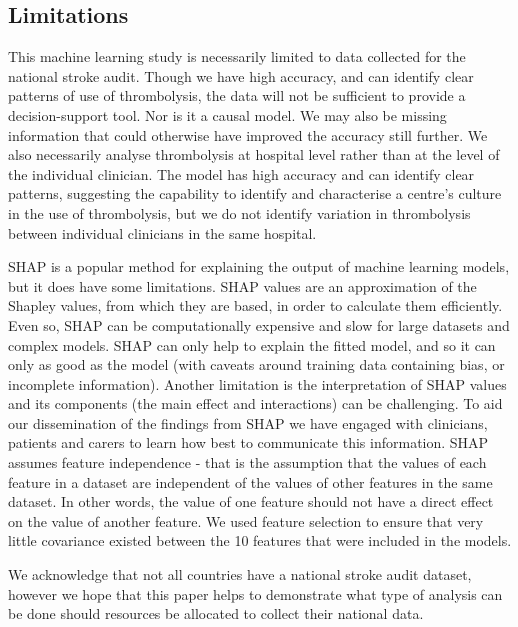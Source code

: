
\subsection{Limitations}

This machine learning study is necessarily limited to data collected for the national stroke audit. Though we have high accuracy, and can identify clear patterns of use of thrombolysis, the data will not be sufficient to provide a decision-support tool. Nor is it a causal model. We may also be missing information that could otherwise have improved the accuracy still further. We also necessarily analyse thrombolysis at hospital level rather than at the level of the individual clinician. The model has high accuracy and can identify clear patterns, suggesting the capability to identify and characterise a centre's culture in the use of thrombolysis, but we do not identify variation in thrombolysis between individual clinicians in the same hospital.

SHAP is a popular method for explaining the output of machine learning models, but it does have some limitations. SHAP values are an approximation of the Shapley values, from which they are based, in order to calculate them efficiently. Even so, SHAP can be computationally expensive and slow for large datasets and complex models. SHAP can only help to explain the fitted model, and so it can only as good as the model (with caveats around training data containing bias, or incomplete information). Another limitation is the interpretation of SHAP values and its components (the main effect and interactions) can be challenging. To aid our dissemination of the findings from SHAP we have engaged with clinicians, patients and carers to learn how best to communicate this information. SHAP assumes feature independence - that is the assumption that the values of each feature in a dataset are independent of the values of other features in the same dataset. In other words, the value of one feature should not have a direct effect on the value of another feature. We used feature selection to ensure that very little covariance existed between the 10 features that were included in the models. %

We acknowledge that not all countries have a national stroke audit dataset, however we hope that this paper helps to demonstrate what type of analysis can be done should resources be allocated to collect their national data.